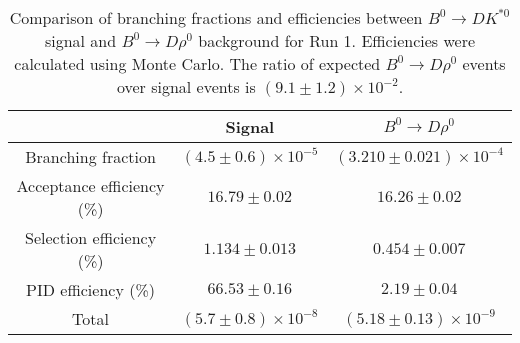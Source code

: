 \begin{table}
    \centering
    \begin{tabular}{ccc}
        \toprule
        & Signal & $B^0 \to D\rho^0$ \\
        \midrule
        Branching fraction & $(4.5 \pm 0.6) \times 10^{-5}$ & $(3.210 \pm 0.021) \times 10^{-4}$ \\
        Acceptance efficiency (\%) & $16.79 \pm 0.02$ & $16.26 \pm 0.02$ \\
        Selection efficiency (\%) & $1.134 \pm 0.013$ & $0.454 \pm 0.007$ \\
        PID efficiency (\%) & $66.53 \pm 0.16$ & $2.19 \pm 0.04$ \\
        \midrule
        Total & $(5.7 \pm 0.8) \times 10^{-8}$ & $(5.18 \pm 0.13) \times 10^{-9}$ \\
        \bottomrule
        \end{tabular}
        \caption{Comparison of branching fractions and efficiencies between $B^0 \to DK^{*0}$ signal and $B^0 \to D\rho^0$ background for Run 1. Efficiencies were calculated using Monte Carlo. The ratio of expected $B^0 \to D\rho^0$ events over signal events is $(9.1 \pm 1.2) \times 10^{-2}$.}
\label{tab:rho_efficiency_run1}
\end{table}

